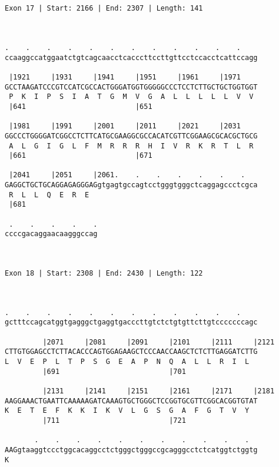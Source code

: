 \documentclass{article}
\begin{document}
{\begin{Verbatim}
                                       
 
Exon 17 | Start: 2166 | End: 2307 | Length: 141



.    .    .    .    .    .    .    .    .    .    .    .    
ccaaggccatggaatctgtcagcaacctcacccttccttgttcctccacctcattccagg
                                                            
 |1921     |1931     |1941     |1951     |1961     |1971    
GCCTAAGATCCCGTCCATCGCCACTGGGATGGTGGGGGCCCTCCTCTTGCTGCTGGTGGT
 P  K  I  P  S  I  A  T  G  M  V  G  A  L  L  L  L  L  V  V 
 |641                          |651                         
  
 |1981     |1991     |2001     |2011     |2021     |2031    
GGCCCTGGGGATCGGCCTCTTCATGCGAAGGCGCCACATCGTTCGGAAGCGCACGCTGCG
 A  L  G  I  G  L  F  M  R  R  R  H  I  V  R  K  R  T  L  R 
 |661                          |671                         
  
 |2041     |2051     |2061.    .    .    .    .    .    .   
GAGGCTGCTGCAGGAGAGGGAGgtgagtgccagtcctgggtgggctcaggagccctcgca
 R  L  L  Q  E  R  E                                        
 |681                                                       
  
 .    .    .    .    .
ccccgacaggaacaagggccag
                      
                      
 
Exon 18 | Start: 2308 | End: 2430 | Length: 122



.    .    .    .    .    .    .    .    .    .    .    .    
gctttccagcatggtgagggctgaggtgacccttgtctctgtgttcttgtcccccccagc
                                                            
         |2071     |2081     |2091     |2101     |2111     |2121
CTTGTGGAGCCTCTTACACCCAGTGGAGAAGCTCCCAACCAAGCTCTCTTGAGGATCTTG
L  V  E  P  L  T  P  S  G  E  A  P  N  Q  A  L  L  R  I  L  
         |691                          |701                 
  
         |2131     |2141     |2151     |2161     |2171     |2181
AAGGAAACTGAATTCAAAAAGATCAAAGTGCTGGGCTCCGGTGCGTTCGGCACGGTGTAT
K  E  T  E  F  K  K  I  K  V  L  G  S  G  A  F  G  T  V  Y  
         |711                          |721                 
  
       .    .    .    .    .    .    .    .    .    .    .  
AAGgtaaggtccctggcacaggcctctgggctgggccgcagggcctctcatggtctggtg
K                                                           
                                                            

\end{Verbatim}}
\end{document}
